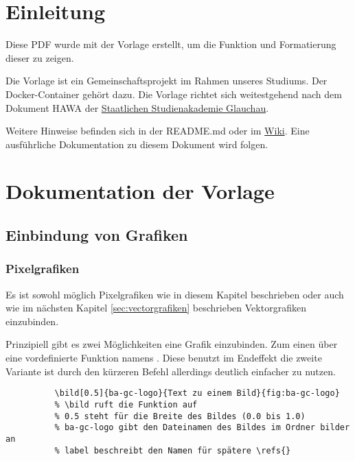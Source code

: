 
\section{Einleitung}
  Diese PDF wurde mit der Vorlage erstellt, um die Funktion und Formatierung dieser zu zeigen.

  Die Vorlage ist ein Gemeinschaftsprojekt im Rahmen unseres Studiums.
  Der Docker-Container gehört dazu.
  Die Vorlage richtet sich weitestgehend nach dem Dokument \ac{HAWA} der \href{https://www.ba-glauchau.de/}{Staatlichen Studienakademie Glauchau}.

  Weitere Hinweise befinden sich in der README.md oder im \href{https://github.com/DSczyrba/Vorlage-Latex/wiki}{Wiki}.
  Eine ausführliche Dokumentation zu diesem Dokument wird folgen.

\section{Dokumentation der Vorlage}
  \subsection{Einbindung von Grafiken}
    \subsubsection{Pixelgrafiken}
      Es ist sowohl möglich Pixelgrafiken wie in diesem Kapitel beschrieben 
      oder auch wie im nächsten Kapitel \ref{sec:vectorgrafiken} beschrieben Vektorgrafiken einzubinden.

      Prinzipiell gibt es zwei Möglichkeiten eine Grafik einzubinden.
      Zum einen über eine vordefinierte Funktion namens \texttt{\bild{}}. 
      Diese benutzt im Endeffekt die zweite Variante ist durch den kürzeren Befehl allerdings deutlich einfacher zu nutzen.
            
      \begin{code}[H]
        \begin{verbatim}
          \bild[0.5]{ba-gc-logo}{Text zu einem Bild}{fig:ba-gc-logo}
          % \bild ruft die Funktion auf
          % 0.5 steht für die Breite des Bildes (0.0 bis 1.0)
          % ba-gc-logo gibt den Dateinamen des Bildes im Ordner bilder an
          % label beschreibt den Namen für spätere \refs{}
        \end{verbatim}
        \caption{Grafiken mittels Bild-Funktion einbinden}
        \label{code:bild-einfuegen1}
        \end{code}


